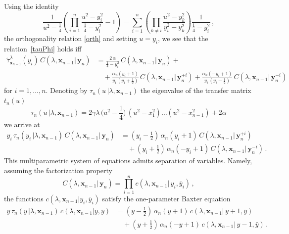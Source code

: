 \documentclass[a4paper,11pt]{article}
\numberwithin{equation}{section}
\begin{document}
Using the identity
\begin{equation*}
    \frac{1}{u^2-\frac{1}{4}}\left(\prod_{i=1}^{n}\frac{u^2-y_i^2}{\frac{1}{4}-y_i^2}-1\right) = \sum_{i=1}^{n}\left(\prod_{k \neq i}\frac{u^2-y_k^2}{y_i^2-y_k^2}\right)\frac{1}{\frac{1}{4}-y_i^2} \,,
\end{equation*}
the orthogonality relation \eqref{orth}
and setting $u = y_i$, we see that the relation~\eqref{tauPhi} holds iff
\begin{align*}
    \tilde{\tau}^{\lambda}_{\bm{x}_{n-1}}(y_i)\,C(\lambda, \bm{x}_{n-1}|\,\bm{y}_{n}) &= \frac{2\,\alpha}{\frac{1}{4}- y_i^2}\,C(\lambda, \bm{x}_{n-1}|\,\bm{y}_{n}) + \\
    &\quad +\frac{\alpha_n(y_i+1)}{y_i\,(y_i+\frac{1}{2})}\,C(\lambda, \bm{x}_{n-1}|\,\bm{y}_{n}^{+i}) + \frac{\alpha_n(-y_i+1)}{y_i\,(y_i-\frac{1}{2})}\,C(\lambda, \bm{x}_{n-1}|\,\bm{y}_{n}^{-i})
\end{align*}
for $i=1,\dots,n$.
Denoting by $\tau_n(u\,|\lambda,\bm{x}_{n-1})$ the eigenvalue of the transfer matrix $t_n(u)$
\begin{equation} \label{tau}
	\tau_n(u\,|\lambda,\bm{x}_{n-1}) = 2\gamma\lambda\,\bigl(u^2-\frac{1}{4}\bigr)\,(u^2-x_1^2) \ldots (u^2-x_{n-1}^2) + 2\alpha
\end{equation}
we arrive at
\begin{equation}\label{sov}
    \begin{split}
        y_i\,\tau_n(y_i\,|\lambda,\bm{x}_{n-1})\,C(\lambda, \bm{x}_{n-1}|\,\bm{y}_{n}) 
        &= \left(y_i-\tfrac{1}{2}\right)\,\alpha_n(y_i+1)\,C(\lambda, \bm{x}_{n-1}|\,\bm{y}_{n}^{+i}) \\
        &\quad + \left(y_i+\tfrac{1}{2}\right)\,\alpha_n(-y_i+1)\,C(\lambda, \bm{x}_{n-1}|\,\bm{y}_{n}^{-i}) \,.
    \end{split}
\end{equation}
This multiparametric system of equations admits separation of variables. Namely, assuming the factorization property
\begin{equation*}
    C(\lambda, \bm{x}_{n-1}|\,\bm{y}_{n}) = \prod\limits_{i=1}^{n} c(\lambda, \bm{x}_{n-1}|\,y_i, \bar{y}_i) \,,
\end{equation*} 
the functions $c(\lambda, \bm{x}_{n-1}|y_i, \bar{y}_i)$ satisfy the one-parameter Baxter equation
\begin{equation}\label{sov2}
    \begin{split}
        y\,\tau_n(y\,|\lambda,\bm{x}_{n-1})\,c(\lambda, \bm{x}_{n-1}|y, \bar{y}) 
        &= \left(y-\tfrac{1}{2}\right)\,\alpha_n(y+1)\,c(\lambda, \bm{x}_{n-1}|\,y+1, \bar{y}) \\
        &\quad + \left(y+\tfrac{1}{2}\right)\,\alpha_n(-y+1)\,c(\lambda, \bm{x}_{n-1}|\,y-1, \bar{y}) \,.
    \end{split} 
\end{equation}
\end{document}

